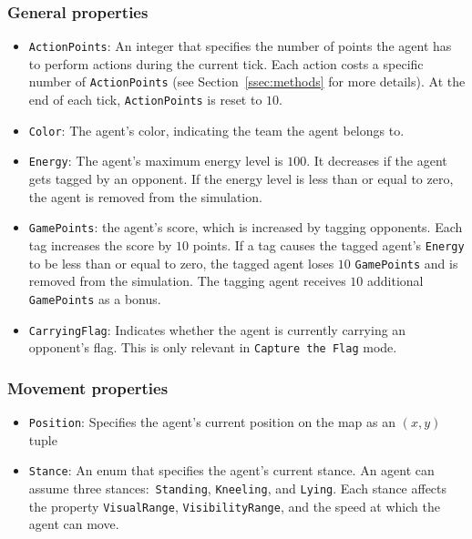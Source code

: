 \documentclass[a4paper,english,DIV=16,11pt,parskip=half,dvipsnames,listof=totoc,index=totoc,bibliography=totoc]{scrartcl}
\begin{document}
\subsubsection{General properties} \label{sssec:genAttr}
\begin{itemize}
  \item \texttt{ActionPoints}: An integer that specifies the number of points the agent has to perform actions during the current tick. Each action costs a specific number of \texttt{ActionPoints} (see Section~\ref{ssec:methods} for more details). At the end of each tick, \texttt{ActionPoints} is reset to $10$.
  \item \texttt{Color}: The agent's color, indicating the team the agent belongs to.
  \item \texttt{Energy}: The agent's maximum energy level is $100$. It decreases if the agent gets tagged by an opponent. If the energy level is less than or equal to zero, the agent is removed from the simulation.
  \item \texttt{GamePoints}: the agent's score, which is increased by tagging opponents. Each tag increases the score by $10$ points. If a tag causes the tagged agent's \texttt{Energy} to be less than or equal to zero, the tagged agent loses $10$ \texttt{GamePoints} and is removed from the simulation. The tagging agent receives $10$ additional \texttt{GamePoints} as a bonus.
  \item \texttt{CarryingFlag}: Indicates whether the agent is currently carrying an opponent's flag. This is only relevant in \texttt{Capture the Flag} mode.
\end{itemize}
%
\subsubsection{Movement properties} \label{sssec:movAttr}
\begin{itemize}
  \item \texttt{Position}: Specifies the agent's current position on the map as an $(x,y)$ tuple
  \item \texttt{Stance}: An enum that specifies the agent's current stance. An agent can assume three stances:~\texttt{Standing}, \texttt{Kneeling}, and \texttt{Lying}. Each stance affects the property \texttt{VisualRange}, \texttt{VisibilityRange}, and the speed at which the agent can move.
\end{itemize}
%
\end{document}

